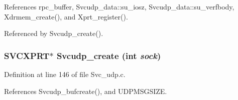 References rpc\_\-buffer, Svcudp\_\-data::su\_\-iosz, Svcudp\_\-data::su\_\-verfbody, Xdrmem\_\-create(), and Xprt\_\-register().

Referenced by Svcudp\_\-create().
\subsubsection{\setlength{\rightskip}{0pt plus 5cm}SVCXPRT$\ast$ Svcudp\_\-create (int {\em sock})}\label{Svc__udp_8c_a11}




Definition at line 146 of file Svc\_\-udp.c.

References Svcudp\_\-bufcreate(), and UDPMSGSIZE.